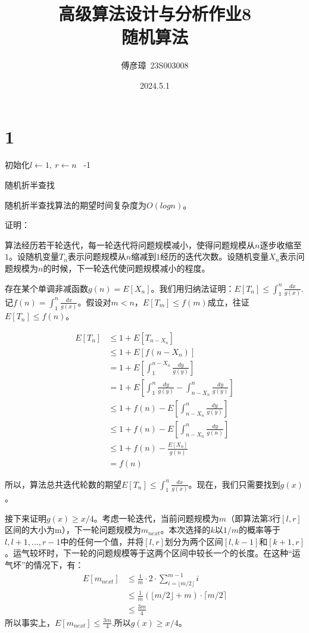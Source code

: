 \documentclass{ctexart}
\title{高级算法设计与分析作业8\\随机算法}
\author{傅彦璋\ 23S003008}
\date{2024.5.1}
\begin{document}
\maketitle

\section*{1}

\begin{algorithm}[H]
  \SetAlgoLined

  初始化$l \leftarrow 1,\ r\leftarrow n $\;
  \Return \  -1
  \caption{随机折半查找}
\end{algorithm}

随机折半查找算法的期望时间复杂度为$O(logn)$。

证明：

算法经历若干轮迭代，每一轮迭代将问题规模减小，使得问题规模从$n$逐步收缩至$1$。设随机变量$T_n$表示问题规模从$n$缩减到$1$经历的迭代次数。设随机变量$X_n$表示问题规模为$n$的时候，下一轮迭代使问题规模减小的程度。

存在某个单调非减函数$g(n)=E[X_n]$。我们用归纳法证明：$E[T_n]\le \int_1^n \frac{dx}{g(x)} $.记$f(n)=\int_1^n \frac{dx}{g(x)}$。假设对$m<n$，$E[T_m]\le f(m)$成立，往证$E[T_n]\le f(n)$。

$$
\begin{aligned}
E[T_n] &\le 1+E[T_{n-X_n}]\\
&\le 1+ E\left[f(n-X_n)\right]\\
&=1+E\left[\int_{1}^{n-X_n}\frac{dy}{g(y)}\right]\\
&=1+E\left[\int_1^n \frac{dy}{g(y)} -\int_{n-X_n}^n\frac{dy}{g(y)}\right]\\
&\le 1+f(n)-E\left[\int_{n-X_n}^n\frac{dy}{g(y)}\right]\\
&\le 1+f(n)-E\left[\int_{n-X_n}^n\frac{dy}{g(n)}\right]\\
&\le 1+f(n)-\frac{E[X_n]}{g(n)}\\
&=f(n)
\end{aligned}
$$

所以，算法总共迭代轮数的期望$E[T_n]\le \int_1^n \frac{dx}{g(x)}$。现在，我们只需要找到$g(x)$。

接下来证明$g(x)\ge x/4$。考虑一轮迭代，当前问题规模为$m$（即算法第3行$[l,r]$区间的大小为m），下一轮问题规模为$m_{next}$。本次选择的$k$以$1/m$的概率等于$l,l+1,...,r-1$中的任何一个值，并将$[l,r]$划分为两个区间$[l,k-1]$和$[k+1,r]$。运气较坏时，下一轮的问题规模等于这两个区间中较长一个的长度。在这种“运气坏”的情况下，有：
$$
\begin{aligned}
E[m_{next}]&\le \frac{1}{m}\cdot 2 \cdot \sum_{i=\lfloor m/2 \rfloor}^{m-1}i\\
&\le \frac{1}{m} \left( \lfloor m/2 \rfloor + m  \right)\cdot \lceil m/2 \rceil\\
&\le \frac{3m}{4}
\end{aligned}
$$
所以事实上，$E[m_{next}] \le \frac{3m}{4}$.所以$g(x) \ge x/4$。
\end{document}
